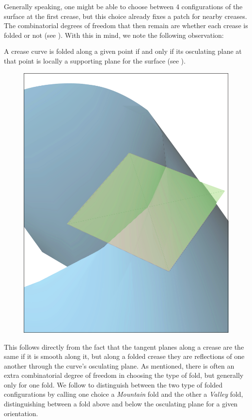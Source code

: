 Generally speaking, one might be able to choose between 4 configurations of the surface at the first crease, but this choice already fixes a patch for nearby creases. The combinatorial degrees of freedom that then remain are whether each crease is folded or not (see  ). With this in mind, we note the following observation:

\begin{theorem}\label{Thm:supporting_plane}
A crease curve is folded along a given point if and only if its osculating plane at that point is locally a supporting plane for the surface (see ).
\end{theorem}

\begin{figure} [h]
	\centering
	\includegraphics[width=0.5\linewidth]{figures/plane_side}
	\caption{}
	\label{fig:plane_side}
\end{figure}

This follows directly from the fact that the tangent planes along a crease are the same if it is smooth along it, but along a folded crease they are reflections of one another through the curve's osculating plane. As mentioned, there is often an extra combinatorial degree of freedom in choosing the type of fold, but generally only for one fold. We follow \cite{demaine_lens} to distinguish between the two type of folded configurations by calling one choice a \textit{Mountain} fold and the other a \textit{Valley} fold, distinguishing between a fold above and below the osculating plane for a given orientation. %


